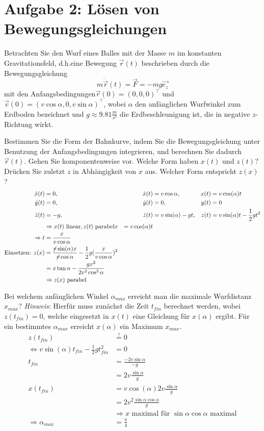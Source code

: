 \section*{Aufgabe 2:  Lösen von Bewegungsgleichungen}
Betrachten Sie den Wurf eines Balles mit der Masse $m$ im konstanten Gravitationsfeld, d.h.eine Bewegung $\overrightarrow{r}(t)$ beschrieben durch die Bewegungsgleichung \[m\ddot{\overrightarrow{r}}(t) = \overrightarrow{F} = -mg\overrightarrow{e_z}\] mit den Anfangsbedingungen$\overrightarrow{r}(0) = (0,0,0)^\top$ und $\overrightarrow{v}(0) = (v\cos\alpha,0,v\sin\alpha)^\top$, wobei $\alpha$ den anfänglichen Wurfwinkel zum Erdboden bezeichnet und $g\approx9.81\frac{m}{s^2}$ die Erdbeschleunigung ist, die in negative $z$-Richtung wirkt.
\begin{enumeralph}
	\item Bestimmen Sie die Form der Bahnkurve, indem Sie die Bewegungsgleichung unter Benutzung der Anfangsbedingungen integrieren, und berechnen Sie dadurch $\overrightarrow{r}(t)$.  Gehen Sie komponentenweise vor.  Welche Form haben $x(t)$ und $z(t)$?  Drücken Sie zuletzt $z$ in Abhängigkeit von $x$ aus.  Welcher Form entspricht $z(x)$?
	\begin{align*}
	\ddot{x}(t) &= 0,& \dot{x}(t) &= v \cos\alpha,&  x(t) &= v\cos(\alpha) t\\
	\ddot{y}(t) &= 0,& \dot{y}(t) &= 0,&  y(t) &= 0\\
	\ddot{z}(t) &= -g,& \dot{z}(t) &= v \sin(\alpha) - gt,&  z(t) &= v \sin(\alpha)t - \frac{1}{2}gt^2\\
	&\Rightarrow x(t) \text{ linear}, z(t) \text{ parabel}
	x &= v\cos(\alpha)t\\
	\Rightarrow t &= \frac{x}{v\cos\alpha}\\
	\text{Einsetzen: } z(x) &= \frac{\cancel{v}\sin(\alpha)x}{\cancel{v}\cos\alpha}-\frac{1}{2}g(\frac{x}{v\cos\alpha})^2\\
	&=x\tan\alpha - \frac{gx^2}{2v^2\cos^2\alpha}\\
	&\Rightarrow z(x) \text{ parabel}
	\end{align*}
	\item Bei welchem anfänglichen Winkel $\alpha_{max}$ erreicht man die maximale Wurfdistanz $x_{max}$? \textit{Hinweis}:  Hierfür muss zunächst die Zeit $t_{fin}$ berechnet werden, wobei $z(t_{fin}) = 0$, welche eingesetzt in $x(t)$ eine Gleichung für $x(\alpha)$ ergibt.  Für ein bestimmtes $\alpha_{max}$ erreicht $x(\alpha)$ ein Maximum $x_{max}$.
	\begin{align*}
	z(t_{fin}) &\overset{!}{=} 0\\
	\Leftrightarrow v\sin(\alpha)t_{fin}-\frac{1}{2}gt_{fin}^2&=0\\
	t_{fin}&=\frac{-2v\sin\alpha}{-g}\\
	&=2v\frac{\sin\alpha}{g}\\
	x(t_{fin})&=v\cos(\alpha)2v\frac{\sin\alpha}{g}\\
	&=2v^2\frac{\sin\alpha\cos\alpha}{g}\\
	&\Rightarrow x\text{ maximal für } \sin\alpha\cos\alpha \text{ maximal}\\
	\Rightarrow \alpha_{max} &=\frac{\pi}{4}
	\end{align*}
\end{enumeralph}

